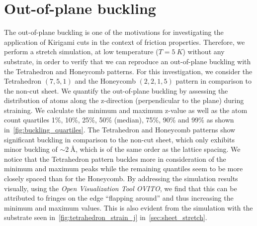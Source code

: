 \begin{figure}[!htb]
    \label{fig:max_peaks}
\end{figure}



\section{Out-of-plane buckling}\label{sec:out-of-plane_buckling}
The out-of-plane buckling is one of the motivations for investigating
the application of Kirigami cuts in the context of friction properties. Therefore, we perform a stretch simulation, at low temperature ($T = \SI{5}{K}$) without any substrate, in order to verify that we can reproduce an out-of-plane buckling with the Tetrahedron and Honeycomb patterns. For this investigation, we consider the Tetrahedron $(7,5,1)$ and the Honeycomb $(2,2,1,5)$ pattern in comparison to the non-cut sheet. We quantify the out-of-plane buckling by assessing the distribution of atoms along the z-direction (perpendicular to the plane) during straining. We calculate the
minimum and maximum z-value as well as the atom count quartiles 1\%, 10\%, 25\%, 50\% (median), 75\%, 90\% and 99\% as shown in~\cref{fig:buckling_quartiles}. The Tetrahedron and Honeycomb patterns show significant buckling in comparison to the non-cut sheet, which only exhibits minor buckling of $\sim \SI{2}{\text{Å}}$, which is of the same order as the lattice spacing. We notice that the Tetrahedron pattern buckles more in consideration of the minimum and maximum peaks while the remaining quantiles seem to be more closely spaced than for the Honeycomb. By addressing the simulation results visually, using the \textit{Open Visualization Tool OVITO}, we find that this can be attributed to fringes on the edge ``flapping around'' and thus increasing the minimum and maximum values. This is also evident from the simulation with the substrate seen in~\cref{fig:tetrahedron_strain_j} in~\cref{sec:sheet_stretch}.


